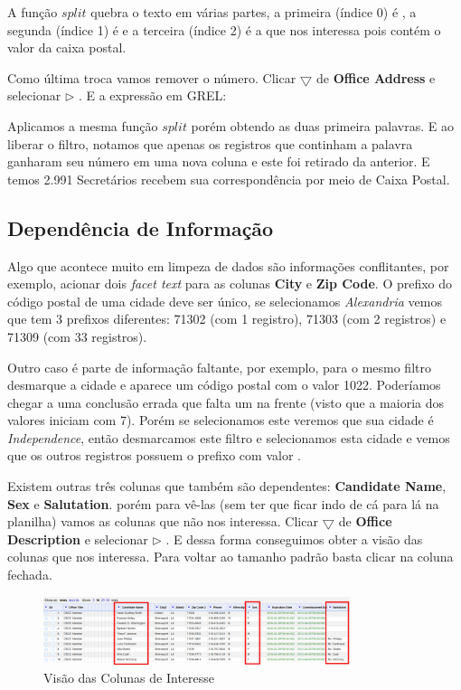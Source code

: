 \documentclass[a4paper,11pt]{article}
\begin{document}
A função $split$ quebra o texto em várias partes, a primeira (índice 0) é , a segunda (índice 1) é  e a terceira (índice 2) é a que nos interessa pois contém o valor da caixa postal. 

Como última troca vamos remover o número. Clicar $\bigtriangledown$ de \textbf{Office Address} e selecionar  $\triangleright$ . E a expressão em GREL: \\

Aplicamos a mesma função $split$ porém obtendo as duas primeira palavras. E ao liberar o filtro, notamos que apenas os registros que continham a palavra  ganharam seu número em uma nova coluna e este foi retirado da anterior. E temos 2.991 Secretários recebem sua correspondência por meio de Caixa Postal.

\subsection{Dependência de Informação}
Algo que acontece muito em limpeza de dados são informações conflitantes, por exemplo, acionar dois \textit{facet text} para as colunas \textbf{City} e \textbf{Zip Code}. O prefixo do código postal de uma cidade deve ser único, se selecionamos \textit{Alexandria} vemos que tem 3 prefixos diferentes: 71302 (com 1 registro), 71303 (com 2 registros) e 71309 (com 33 registros). 

Outro caso é parte de informação faltante, por exemplo, para o mesmo filtro desmarque a cidade e aparece um código postal com o valor 1022. Poderíamos chegar a uma conclusão errada que falta um  na frente (visto que a maioria dos valores iniciam com 7). Porém se selecionamos este veremos que sua cidade é \textit{Independence}, então desmarcamos este filtro e selecionamos esta cidade e vemos que os outros registros possuem o prefixo com valor .

Existem outras três colunas que também são dependentes: \textbf{Candidate Name}, \textbf{Sex} e \textbf{Salutation}. porém para vê-las (sem ter que ficar indo de cá para lá na planilha) vamos  as colunas que não nos interessa. Clicar $\bigtriangledown$ de \textbf{Office Description} e selecionar  $\triangleright$ . E dessa forma conseguimos obter a visão das colunas que nos interessa. Para voltar ao tamanho padrão basta clicar na coluna fechada.
\begin{figure}[H]
	\centering
	\includegraphics[width=0.8\textwidth]{imagem/colunasEncolhidas.png}
	\caption{Visão das Colunas de Interesse}
\end{figure}
\end{document}
